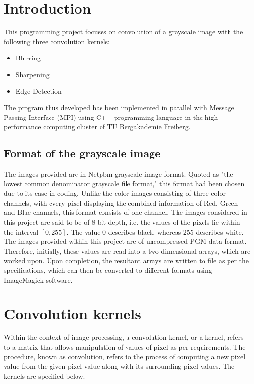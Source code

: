 \documentclass[sprache=english,fontsize=11,hausschrift=times,betreuerform=tabelle]{TUBAFarbeiten}
\begin{document}
\maketitle[intertext={A report on}]
\TUBAFErklaerungsseite
\tableofcontents
\listoffigures
\clearpage
\section{Introduction}
This programming project focuses on convolution of a grayscale image with the following three convolution 
kernels:
\begin{itemize}
    \item Blurring
    \item Sharpening
    \item Edge Detection
\end{itemize}

The program thus developed has been implemented in parallel with Message Passing Interface (MPI) 
using C++ programming language in the high performance computing cluster of TU Bergakademie Freiberg. 

\subsection*{Format of the grayscale image}
The images provided are in Netpbm grayscale image format. Quoted as "the lowest common denominator grayscale 
file format," this format had been chosen due to its ease in coding. Unlike the color images consisting of three color channels,
with every pixel displaying the combined information of Red, Green and Blue channels, this format consists of one channel.
The images considered in this project are said to be of 8-bit depth, i.e. the values of the pixels lie within the interval $[0,255]$.
The value 0 describes black, whereas 255 describes white. The images provided within this project are of uncompressed PGM data format. 
Therefore, initially, these values are read into a two-dimensional arrays, which are worked upon. Upon completion, the resultant arrays 
are written to file as per the specifications, which can then be converted to different formats using ImageMagick software. 
\section{Convolution kernels}
Within the context of image processing, a convolution kernel, or a kernel, refers to a matrix that allows manipulation of values of pixel
as per requirements. The procedure, known as convolution, refers to the process of computing a new pixel value from the given pixel value along
with its surrounding pixel values. The kernels are specified below. 
\end{document}

